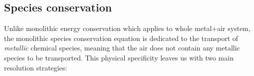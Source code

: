 \subsection{Species conservation} \label{sec:monolithic_species}

Unlike monolithic energy conservation which applies to whole metal+air system, the monolithic species conservation equation is dedicated
to the transport of \emph{metallic} chemical species, meaning that the air does not contain any metallic species to be transported.
This physical specificity leaves us with two main resolution strategies:

